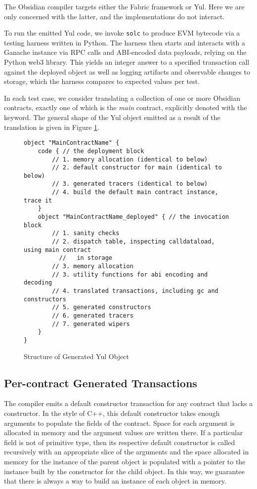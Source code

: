 The Obsidian compiler targets either the Fabric framework or Yul. Here we
are only concerned with the latter, and the implementations do not
interact.

To run the emitted Yul code, we invoke \texttt{solc} to produce EVM
bytecode via a testing harness written in Python. The harness then starts
and interacts with a Ganache instance via RPC calls and ABI-encoded data
payloads, relying on the Python web3 library. This yields an integer answer
to a specified transaction call against the deployed object as well as
logging artifacts and observable changes to storage, which the harness
compares to expected values per test.

In each test case, we consider translating a collection of one or more
Obsidian contracts, exactly one of which is the \emph{main} contract,
explicitly denoted with the  keyword. The general shape of the
Yul object emitted as a result of the translation is given in
Figure \ref{code.1}.

\begin{figure}[hbtp]
    \caption{Structure of Generated Yul Object}
    \label{code.1}
    \begin{lstlisting}[language=yul,frame=single]
object "MainContractName" {
    code { // the deployment block
        // 1. memory allocation (identical to below)
        // 2. default constructor for main (identical to below)
        // 3. generated tracers (identical to below)
        // 4. build the default main contract instance, trace it
    }
    object "MainContractName_deployed" { // the invocation block
        // 1. sanity checks
        // 2. dispatch table, inspecting calldataload, using main contract
          //   in storage
        // 3. memory allocation
        // 3. utility functions for abi encoding and decoding
        // 4. translated transactions, including gc and constructors
        // 5. generated constructors
        // 6. generated tracers
        // 7. generated wipers
    }
}
    \end{lstlisting}
\end{figure}

\subsection{Per-contract Generated Transactions}

The compiler emits a default constructor transaction for any contract that
lacks a constructor. In the style of C++, this default constructor takes
enough arguments to populate the fields of the contract. \cite{TODO} Space
for each argument is allocated in memory and the argument values are
written there. If a particular field is not of primitive type, then its
respective default constructor is called recursively with an appropriate
slice of the arguments and the space allocated in memory for the instance
of the parent object is populated with a pointer to the instance built by
the constructor for the child object. In this way, we guarantee that there
is always a way to build an instance of each object in memory.

